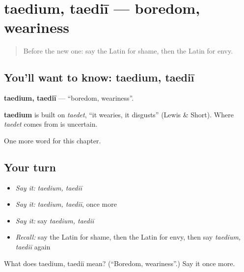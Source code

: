 \section[taedium, taediī]{taedium, taediī — boredom, weariness}

\label{lesson:LA-C262-taedium}



\begin{quote}
Before the new one: say the Latin for shame, then the Latin for envy.
\end{quote}

\subsection*{You'll want to know: taedium, taediī}
\textbf{taedium, taediī} — \textquotedblleft{}boredom, weariness\textquotedblright{}.

\begin{cousinweb}
\textbf{taedium} is built on \emph{taedet}, \textquotedblleft{}it wearies, it disgusts\textquotedblright{} (Lewis \& Short). Where \emph{taedet} comes from is uncertain.
\end{cousinweb}

\begin{grammarlens}[title={What you've built}]
One more word for this chapter.
\end{grammarlens}

\subsection*{Your turn}
\begin{itemize}
\raggedright
  \item \emph{Say it:} \emph{taedium, taediī}
  \item \emph{Say it:} \emph{taedium, taediī}, once more
  \item \emph{Say it:} say \emph{taedium, taediī}
  \item \emph{Recall:} say the Latin for shame, then the Latin for envy, then say \emph{taedium, taediī} again
\end{itemize}

\begin{tcolorbox}[breakable,colback=teal!4,colframe=teal!35!black,title={Before you move on}]
What does taedium, taediī mean? (\textquotedblleft{}Boredom, weariness\textquotedblright{}.) Say it once more.
\end{tcolorbox}

